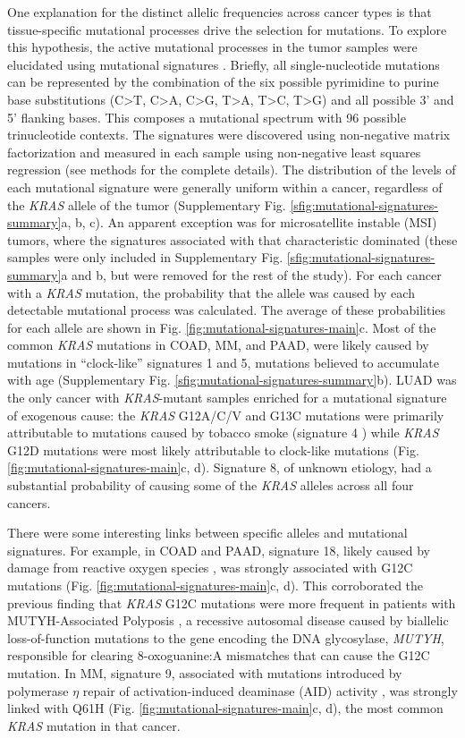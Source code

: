 \documentclass[english, 10pt, letterpaper]{article}
\newcommand{\KRAS}{\emph{KRAS}}
\begin{document}
One explanation for the distinct allelic frequencies across cancer types is that tissue-specific mutational processes drive the selection for mutations.
To explore this hypothesis, the active mutational processes in the tumor samples were elucidated using mutational signatures \cite{Alexandrov2013}. 
Briefly, all single-nucleotide mutations can be represented by the combination of the six possible pyrimidine to purine base substitutions (C>T, C>A, C>G, T>A, T>C, T>G) and all possible 3’ and 5’ flanking bases. 
This composes a mutational spectrum with 96 possible trinucleotide contexts. 
The signatures were discovered using non-negative matrix factorization and measured in each sample using non-negative least squares regression (see methods for the complete details). 
The distribution of the levels of each mutational signature were generally uniform within a cancer, regardless of the \KRAS{} allele of the tumor (Supplementary Fig. \ref{sfig:mutational-signatures-summary}a, b, c). 
An apparent exception was for microsatellite instable (MSI) tumors, where the signatures associated with that characteristic dominated (these samples were only included in Supplementary Fig. \ref{sfig:mutational-signatures-summary}a and b, but were removed for the rest of the study). 
For each cancer with a \KRAS{} mutation, the probability that the allele was caused by each detectable mutational process was calculated. 
The average of these probabilities for each allele are shown in Fig. \ref{fig:mutational-signatures-main}c. 
Most of the common \KRAS{} mutations in COAD, MM, and PAAD, were likely caused by mutations in “clock-like” signatures 1 and 5, mutations believed to accumulate with age \cite{Alexandrov2015} (Supplementary Fig. \ref{sfig:mutational-signatures-summary}b). 
LUAD was the only cancer with \KRAS{}-mutant samples enriched for a mutational signature of exogenous cause: the \KRAS{} G12A/C/V and G13C mutations were primarily attributable to mutations caused by tobacco smoke (signature 4 \cite{Alexandrov2016}) while \KRAS{} G12D mutations were most likely attributable to clock-like mutations (Fig. \ref{fig:mutational-signatures-main}c, d).
Signature 8, of unknown etiology, had a substantial probability of causing some of the \KRAS{} alleles across all four cancers.

There were some interesting links between specific alleles and mutational signatures.
For example, in COAD and PAAD, signature 18, likely caused by damage from reactive oxygen species \cite{Viel2017, Pilati2017}, was strongly associated with G12C mutations (Fig. \ref{fig:mutational-signatures-main}c, d).
This corroborated the previous finding that \KRAS{} G12C mutations were more frequent in patients with MUTYH-Associated Polyposis \cite{Viel2017}, a recessive autosomal disease caused by biallelic loss-of-function mutations to the gene encoding the DNA glycosylase, \emph{MUTYH}, responsible for clearing 8-oxoguanine:A mismatches that can cause the G12C mutation.
In MM, signature 9, associated with mutations introduced by polymerase $\eta$ repair of activation-induced deaminase (AID) activity \cite{Alexandrov2013, Rogozin2018DNACancer., Petljak2016UnderstandingCancer.}, was strongly linked with Q61H (Fig. \ref{fig:mutational-signatures-main}c, d), the most common \KRAS{} mutation in that cancer.
\end{document}
